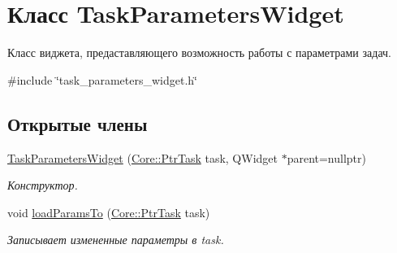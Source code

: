 \hypertarget{class_task_parameters_widget}{}\section{Класс Task\+Parameters\+Widget}
\label{class_task_parameters_widget}


Класс виджета, предаставляющего возможность работы с параметрами задач.  




{\ttfamily \#include \char`\"{}task\+\_\+parameters\+\_\+widget.\+h\char`\"{}}

\subsection*{Открытые члены}
\begin{DoxyCompactItemize}
\item 
\hyperlink{class_task_parameters_widget_af744e624424645246d77dfde391868a3}{Task\+Parameters\+Widget} (\hyperlink{namespace_core_abfda8f69fcacfcea2696549b548ed737}{Core\+::\+Ptr\+Task} task, Q\+Widget $\ast$parent=nullptr)\hypertarget{class_task_parameters_widget_af744e624424645246d77dfde391868a3}{}\label{class_task_parameters_widget_af744e624424645246d77dfde391868a3}

\begin{DoxyCompactList}\small\item\em Конструктор. \end{DoxyCompactList}\item 
void \hyperlink{class_task_parameters_widget_a0ea478c1087cbeed8880a07c382d6667}{load\+Params\+To} (\hyperlink{namespace_core_abfda8f69fcacfcea2696549b548ed737}{Core\+::\+Ptr\+Task} task)\hypertarget{class_task_parameters_widget_a0ea478c1087cbeed8880a07c382d6667}{}\label{class_task_parameters_widget_a0ea478c1087cbeed8880a07c382d6667}

\begin{DoxyCompactList}\small\item\em Записывает измененные параметры в task. \end{DoxyCompactList}\end{DoxyCompactItemize}
